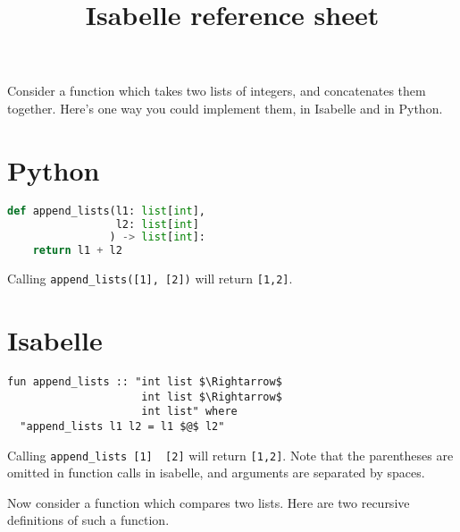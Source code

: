\documentclass[a4paper]{article}
\begin{document}
\title{Isabelle reference sheet}
\maketitle

Consider a function which takes two lists of integers, and concatenates them
together.
Here's one way you could implement them, in Isabelle and in Python.

\begin{minipage}[t]{0.5\textwidth}
    \section*{Python}
    \begin{lstlisting}[language=python]
def append_lists(l1: list[int],
                 l2: list[int]
                ) -> list[int]:
    return l1 + l2 
    \end{lstlisting}

    Calling \lstinline{}\lstinline{append_lists([1], [2])}
    will return \lstinline{[1,2]}.
\end{minipage}
\begin{minipage}[t]{0.5\textwidth}
    \section*{Isabelle}
    \begin{lstlisting}[language=isabelle]
fun append_lists :: "int list $\Rightarrow$
                     int list $\Rightarrow$
                     int list" where
  "append_lists l1 l2 = l1 $@$ l2"
    \end{lstlisting}
    Calling \lstinline{}\lstinline{append_lists [1]  [2]}
    will return \lstinline{[1,2]}.
    Note that the parentheses are omitted in function calls in isabelle,
    and arguments are separated by spaces.
\end{minipage}

\vspace{40pt}
Now consider a function which compares two lists.
Here are two recursive definitions of such a function.
\end{document}
